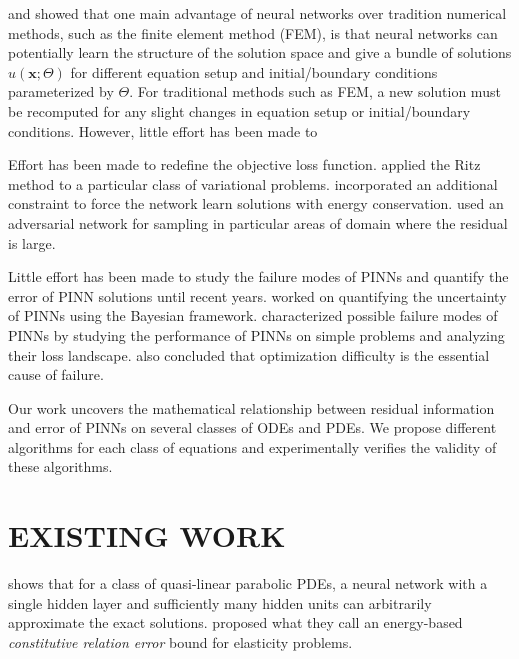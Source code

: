 \documentclass[accepted]{uai2023}
\newcommand{\vect}[1]{\mathbf{#1}}
\begin{document}
    \cite{flamant2020solving} and \cite{DesaiShaan2021OTLo} showed that one main advantage of neural networks over tradition numerical methods, such as the finite element method (FEM), is that neural networks can potentially learn the structure of the solution space and give a bundle of solutions $u(\vect{x}; \Theta)$ for different equation setup and initial/boundary conditions parameterized by $\Theta$.
    For traditional methods such as FEM, a new solution must be recomputed for any slight changes in equation setup or initial/boundary conditions.
    However, little effort has been made to 

    Effort has been made to redefine the objective loss function. 
    \cite{yu2017deep} applied the Ritz method to a particular class of variational problems.
    \cite{mattheakis2020hamiltonian} incorporated an additional constraint to force the network learn solutions with energy conservation.
    \cite{parwani2021adversarial} used an adversarial network for sampling in particular areas of domain where the residual is large.

    Little effort has been made to study the failure modes of PINNs and quantify the error of PINN solutions until recent years. 
    \cite{graf2021uncertainty} worked on quantifying the uncertainty of PINNs using the Bayesian framework.
    \cite{krishnapriyan2021characterizing} characterized possible failure modes of PINNs by studying the performance of PINNs on simple problems and analyzing their loss landscape. 
    \citeauthor{krishnapriyan2021characterizing} also concluded that optimization difficulty is the essential cause of failure.

    Our work uncovers the mathematical relationship between residual information and error of PINNs on several classes of ODEs and PDEs. 
    We propose different algorithms for each class of equations and experimentally verifies the validity of these algorithms.

\section{EXISTING WORK}\label{section:existing-work}
    \cite{sirignano2018dgm} shows that for a class of quasi-linear parabolic PDEs, a neural network with a single hidden layer and sufficiently many hidden units can arbitrarily approximate the exact solutions.
    \cite{guo2022energy} proposed what they call an energy-based \textit{constitutive relation error} bound for elasticity problems.
\end{document}
